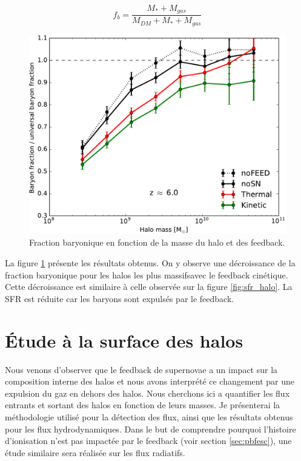 \begin{equation}
f_b = \frac{M_* + M_{gas} }{M_{DM} + M_* + M_{gas} }
\end{equation}

\begin{figure}
		\includegraphics[width=.95\linewidth]{img/03/baryon_frac.pdf}
        \caption[Fraction baryonique]{Fraction baryonique en fonction de la masse du halo et des feedback.
 		\label{fig:bfrac}}
\end{figure}

La figure \ref{fig:bfrac} présente les résultats obtenus.
On y observe une décroissance de la fraction baryonique pour les halos les plus massifsavec le feedback cinétique.
Cette décroissance est similaire à celle observée sur la figure \ref{fig:sfr_halo}.
La \ac{SFR} est réduite car les baryons sont expulsés par le feedback.


\clearpage
\section{Étude à la surface des halos}

Nous venons d'observer que le feedback de supernovae a un impact sur la composition interne des halos et nous avons interprété ce changement par une expulsion du gaz en dehors des halos.
Nous cherchons ici a quantifier les flux entrants et sortant des halos en fonction de leurs masses.
Je présenterai la méthodologie utilisé pour la détection des flux, ainsi que les résultats obtenus pour les flux hydrodynamiques.
Dans le but de comprendre pourquoi l'histoire d'ionisation n'est pas impactée par le feedback (voir section \ref{sec:pbfesc}), une étude similaire sera réalisée sur les flux radiatifs.

